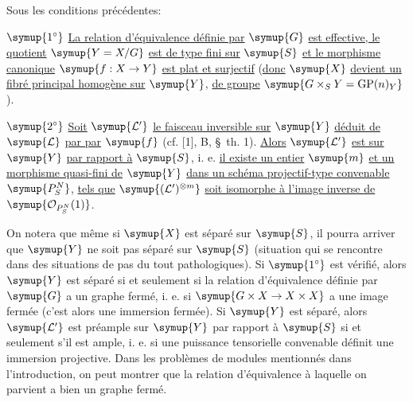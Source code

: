  Sous les conditions précédentes:

\smallskip
\noindent $\symup{1^\circ}$ \uline{La relation d'équivalence définie par} $\symup{G}$ \uline{est
effective, le quotient} $\symup{Y=X/G}$ \uline{est de type fini sur} $\symup{S}$ \uline{et le morphisme
canonique} $\symup{f:X\to Y}$ \uline{est plat et surjectif} (\uline{donc} $\symup{X}$ \uline{devient un fibré
principal homogène sur} $\symup{Y}$, \uline{de groupe} $\symup{G\times_S Y=\operatorname{GP}(n)_Y}$).

\smallskip
\noindent $\symup{2^\circ}$ \uline{Soit} $\symup{\mathcal L'}$ \uline{le faisceau inversible sur} $\symup{Y}$ \uline{déduit de} $\symup{\mathcal L}$ \uline{par  par} $\symup{f}$ (cf. [1], B, \S~th. 1). \uline{Alors} $\symup{\mathcal L'}$ \uline{est  sur} $\symup{Y}$ \uline{par rapport à} $\symup{S}$,
i. e. \uline{il existe un entier} $\symup{m}$ \uline{et un morphisme quasi-fini de} $\symup{Y}$ \uline{dans un schéma projectif-type convenable} $\symup{P_S^N}$, \uline{tels que} $\symup{(\mathcal L')^{\otimes m}}$ \uline{soit isomorphe à l'image inverse de} $\symup{\mathcal O_{P_S^N}(1)}$.

On notera que même si $\symup{X}$ est séparé sur $\symup{S}$, il pourra arriver que $\symup{Y}$ ne soit
pas séparé sur $\symup{S}$ (situation qui se rencontre dans des situations de
 pas du tout pathologiques). Si $\symup{1^\circ}$ est vérifié,
alors $\symup{Y}$ est séparé si et seulement si la relation d'équivalence définie par
$\symup{G}$ a un graphe fermé, i. e. si $\symup{G\times X\to X\times X}$ a une image fermée
(c'est alors une immersion fermée). Si $\symup{Y}$ est séparé, alors $\symup{\mathcal L'}$ est
préample sur $\symup{Y}$ par rapport à $\symup{S}$ si et seulement s'il est ample, i. e. si
une puissance tensorielle convenable définit une immersion projective. Dans
les problèmes de modules mentionnés dans l'introduction, on peut montrer que la
relation d'équivalence à laquelle on parvient a bien un graphe fermé.

